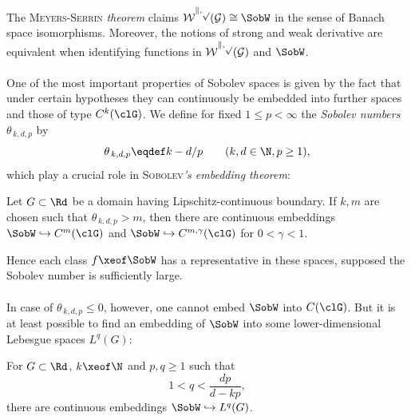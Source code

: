\documentclass[11pt,twoside]{article}
\def\G{G}
\begin{document}
\begin{itemize}[leftmargin=12pt,itemsep=5pt]
\begin{itemize}[leftmargin=17pt]
\paragraph{} %
The \textsc{Meyers-Serrin} \textit{theorem} claims
$\cal{W}^{k,p}(\G) \cong \SobW$ in the sense of Banach space isomorphisms.
Moreover,
the notions of strong and weak derivative are equivalent
when identifying functions in $\cal{W}^{k,p}(\G)$ and $\SobW$.

\paragraph{} %
One of the most important properties of Sobolev spaces is given by the fact
that under certain hypotheses they can continuously be embedded
into further spaces and those of type $C^k(\clG)$.
We define for fixed $1 \leq p < \infty$
the \textit{Sobolev numbers} $\theta_{\,k,d,p}$ by
\[
\theta_{\,k,d,p} \eqdef k - d/p
\quad \quad (k,d \in \N, p \geq 1),
\]
which play a crucial role in \textsc{Sobolev}\textit{'s embedding theorem}:

\begin{theorem1}\label{I_SOBOLEV_EMBEDDING_THEOREM_1}
Let $\G \subset \Rd$ be a domain having Lipschitz-continuous boundary.
If $k,m$ are chosen such that $\theta_{\,k,d,p} > m$,
then there are continuous embeddings
$\SobW \hookrightarrow C^m(\clG)$ and
$\SobW \hookrightarrow C^{m,\gamma}(\clG)$ for $0 < \gamma < 1$.
\end{theorem1}

Hence each class $f \xeof \SobW$ has a representative in these spaces,
supposed the Sobolev number is sufficiently large.

\paragraph{} %
In case of $\theta_{\,k,d,p} \leq 0$,
however,
one cannot embed $\SobW$ into $C(\clG)$.
But it is at least possible to find an embedding of $\SobW$
into some lower-dimensional Lebesgue spaces $L^q(\G)$:

\begin{theorem1}\label{I_SOBOLEV_EMBEDDING_THEOREM_2}
For $\G \subset \Rd$,
$k \xeof \N$ and $p,q \geq 1$ such that
\[
1 < q < \frac{dp}{d-kp},
\]
there are continuous embeddings $\SobW \hookrightarrow L^q(\G)$.
\end{theorem1}


\end{itemize}
\end{itemize}
\end{document}
